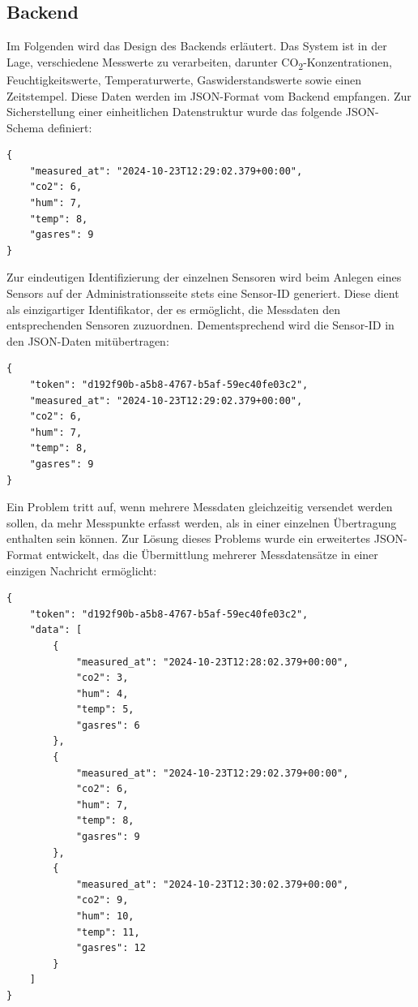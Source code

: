 \begin{inhalt}
\subsection{Backend} \label{sec:Backend-Design}
\label{ref:backend_design}

Im Folgenden wird das Design des Backends erläutert. Das System ist in der Lage, verschiedene Messwerte zu verarbeiten, darunter CO\textsubscript{2}-Konzentrationen, Feuchtigkeitswerte, Temperaturwerte, Gaswiderstandswerte sowie einen Zeitstempel. Diese Daten werden im JSON-Format vom Backend empfangen. Zur Sicherstellung einer einheitlichen Datenstruktur wurde das folgende JSON-Schema definiert:

\begin{lstlisting}[style=myjson]
{
    "measured_at": "2024-10-23T12:29:02.379+00:00",
    "co2": 6,
    "hum": 7,
    "temp": 8,
    "gasres": 9
}
\end{lstlisting}

\vspace{3cm}

Zur eindeutigen Identifizierung der einzelnen Sensoren wird beim Anlegen eines Sensors auf der Administrationsseite stets eine Sensor-ID generiert. Diese dient als einzigartiger Identifikator, der es ermöglicht, die Messdaten den entsprechenden Sensoren zuzuordnen. Dementsprechend wird die Sensor-ID in den JSON-Daten mitübertragen:

\begin{lstlisting}[style=myjson]
{
    "token": "d192f90b-a5b8-4767-b5af-59ec40fe03c2",
    "measured_at": "2024-10-23T12:29:02.379+00:00",
    "co2": 6,
    "hum": 7,
    "temp": 8,
    "gasres": 9
}
\end{lstlisting}

\newpage

Ein Problem tritt auf, wenn mehrere Messdaten gleichzeitig versendet werden sollen, da mehr Messpunkte erfasst werden, als in einer einzelnen Übertragung enthalten sein können. Zur Lösung dieses Problems wurde ein erweitertes JSON-Format entwickelt, das die Übermittlung mehrerer Messdatensätze in einer einzigen Nachricht ermöglicht:

\begin{lstlisting}[style=myjson]
{
    "token": "d192f90b-a5b8-4767-b5af-59ec40fe03c2",
    "data": [
        {
            "measured_at": "2024-10-23T12:28:02.379+00:00",
            "co2": 3,
            "hum": 4,
            "temp": 5,
            "gasres": 6
        },
        {
            "measured_at": "2024-10-23T12:29:02.379+00:00",
            "co2": 6,
            "hum": 7,
            "temp": 8,
            "gasres": 9
        },
        {
            "measured_at": "2024-10-23T12:30:02.379+00:00",
            "co2": 9,
            "hum": 10,
            "temp": 11,
            "gasres": 12
        }
    ]
}
\end{lstlisting}


\end{inhalt}
